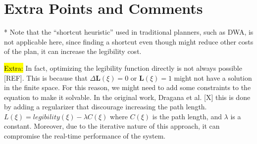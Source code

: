 \section{Extra Points and Comments}


* Note that the ``shortcut heuristic'' used in traditional planners, such as DWA, is not applicable here,
since finding a shortcut even though might reduce other costs of the plan, it can increase the legibility cost.


\vspace{0.3cm}
\hl{Extra:}
In fact, optimizing the legibility function directly is not always possible [REF].
This is because that $\Delta \mathbf{L}(\xi) = 0$ or $\mathbf{L}(\xi) = 1$ might not have a solution in the finite space.
For this reason, we might need to add some constraints to the equation to make it solvable.
In the original work, Dragana et al. [X] this is done by adding a regularizer that discourage increasing the path length.
$L(\xi) = legibility(\xi) - \lambda C(\xi)$
where $C(\xi)$ is the path length, and $\lambda$ is a constant.
Moreover, due to the iterative nature of this approach, it can compromise the real-time performance of the system.
